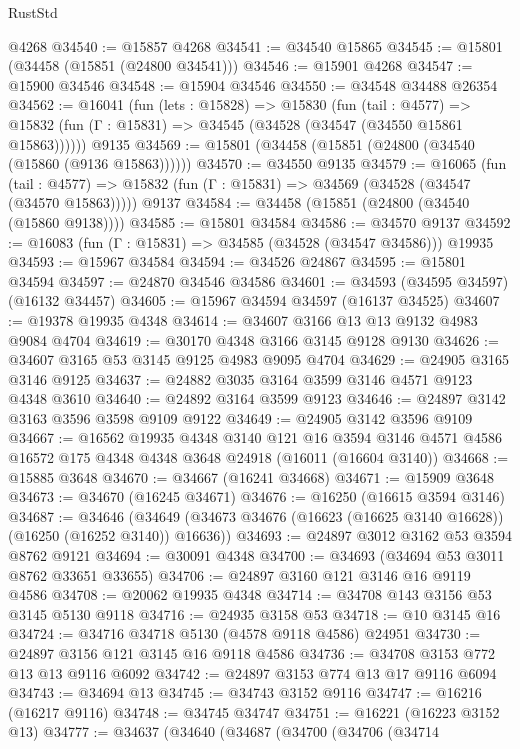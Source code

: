 \begin{lexlean}{RustStd}
\begin{coremodule}
    @4268
@34540 := @15857 @4268
@34541 := @34540 @15865
@34545 := @15801 (@34458 (@15851 (@24800 @34541)))
@34546 := @15901 @4268
@34547 := @15900 @34546
@34548 := @15904 @34546
@34550 := @34548 @34488 @26354
@34562 := @16041
    (fun (lets : @15828) =>
    @15830
      (fun (tail : @4577) =>
      @15832 (fun (Γ : @15831) => @34545 (@34528 (@34547 (@34550 @15861 @15863))))))
    @9135
@34569 := @15801 (@34458 (@15851 (@24800 (@34540 (@15860 (@9136 @15863))))))
@34570 := @34550 @9135
@34579 := @16065
    (fun (tail : @4577) => @15832 (fun (Γ : @15831) => @34569 (@34528 (@34547 (@34570 @15863)))))
    @9137
@34584 := @34458 (@15851 (@24800 (@34540 (@15860 @9138))))
@34585 := @15801 @34584
@34586 := @34570 @9137
@34592 := @16083 (fun (Γ : @15831) => @34585 (@34528 (@34547 @34586))) @19935
@34593 := @15967 @34584
@34594 := @34526 @24867
@34595 := @15801 @34594
@34597 := @24870 @34546 @34586
@34601 := @34593 (@34595 @34597) (@16132 @34457)
@34605 := @15967 @34594 @34597 (@16137 @34525)
@34607 := @19378 @19935 @4348
@34614 := @34607 @3166 @13 @13 @9132 @4983 @9084 @4704
@34619 := @30170 @4348 @3166 @3145 @9128 @9130
@34626 := @34607 @3165 @53 @3145 @9125 @4983 @9095 @4704
@34629 := @24905 @3165 @3146 @9125
@34637 := @24882 @3035 @3164 @3599 @3146 @4571 @9123 @4348 @3610
@34640 := @24892 @3164 @3599 @9123
@34646 := @24897 @3142 @3163 @3596 @3598 @9109 @9122
@34649 := @24905 @3142 @3596 @9109
@34667 := @16562
    @19935
    @4348
    @3140
    @121
    @16
    @3594
    @3146
    @4571
    @4586
    @16572
    @175
    @4348
    @4348
    @3648
    @24918
    (@16011 (@16604 @3140))
@34668 := @15885 @3648
@34670 := @34667 (@16241 @34668)
@34671 := @15909 @3648
@34673 := @34670 (@16245 @34671)
@34676 := @16250 (@16615 @3594 @3146)
@34687 := @34646
    (@34649 (@34673 @34676 (@16623 (@16625 @3140 @16628)) (@16250 (@16252 @3140)) @16636))
@34693 := @24897 @3012 @3162 @53 @3594 @8762 @9121
@34694 := @30091 @4348
@34700 := @34693 (@34694 @53 @3011 @8762 @33651 @33655)
@34706 := @24897 @3160 @121 @3146 @16 @9119 @4586
@34708 := @20062 @19935 @4348
@34714 := @34708 @143 @3156 @53 @3145 @5130 @9118
@34716 := @24935 @3158 @53
@34718 := @10 @3145 @16
@34724 := @34716 @34718 @5130 (@4578 @9118 @4586) @24951
@34730 := @24897 @3156 @121 @3145 @16 @9118 @4586
@34736 := @34708 @3153 @772 @13 @13 @9116 @6092
@34742 := @24897 @3153 @774 @13 @17 @9116 @6094
@34743 := @34694 @13
@34745 := @34743 @3152 @9116
@34747 := @16216 (@16217 @9116)
@34748 := @34745 @34747
@34751 := @16221 (@16223 @3152 @13)
@34777 := @34637
    (@34640
      (@34687
        (@34700
          (@34706
            (@34714

\end{coremodule}
\end{lexlean}
